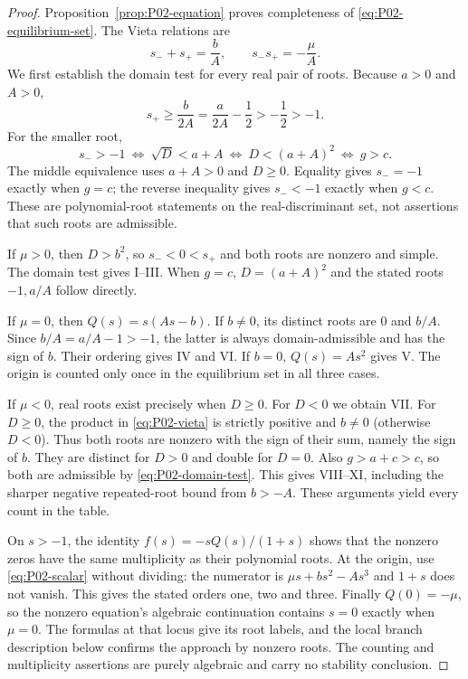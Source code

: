 \documentclass[11pt]{article}
\theoremstyle{definition}
\theoremstyle{remark}
\begin{document}
\begin{proof}
Proposition~\ref{prop:P02-equation} proves completeness of
\eqref{eq:P02-equilibrium-set}. The Vieta relations are
\begin{equation}
\label{eq:P02-vieta}
 s_-+s_+=\frac bA,\qquad s_-s_+=-\frac\mu A.
\end{equation}
We first establish the domain test for every real pair of roots.
Because $a>0$ and $A>0$,
\[
 s_+\ge\frac b{2A}=\frac a{2A}-\frac12>-\frac12>-1.
\]
For the smaller root,
\begin{equation}
\label{eq:P02-domain-test}
 s_->-1
 \ \Longleftrightarrow\ \sqrt D<a+A
 \ \Longleftrightarrow\ D<(a+A)^2
 \ \Longleftrightarrow\ g>c.
\end{equation}
The middle equivalence uses $a+A>0$ and $D\ge0$. Equality gives
$s_-=-1$ exactly when $g=c$; the reverse inequality gives $s_-<-1$
exactly when $g<c$. These are polynomial-root statements on the
real-discriminant set, not assertions that such roots are admissible.

If $\mu>0$, then $D>b^2$, so $s_-<0<s_+$ and both roots are
nonzero and simple. The domain test gives I--III. When $g=c$,
$D=(a+A)^2$ and the stated roots $-1,a/A$ follow directly.

If $\mu=0$, then $Q(s)=s(As-b)$. If $b\ne0$, its distinct roots
are $0$ and $b/A$. Since $b/A=a/A-1>-1$, the latter is always
domain-admissible and has the sign of $b$. Their ordering gives
IV and VI. If $b=0$, $Q(s)=As^2$ gives V. The origin is counted
only once in the equilibrium set in all three cases.

If $\mu<0$, real roots exist precisely when $D\ge0$. For $D<0$
we obtain VII. For $D\ge0$, the product in \eqref{eq:P02-vieta}
is strictly positive and $b\ne0$ (otherwise $D<0$). Thus both
roots are nonzero with the sign of their sum, namely the sign of $b$.
They are distinct for $D>0$ and double for $D=0$. Also
$g>a+c>c$, so both are admissible by \eqref{eq:P02-domain-test}.
This gives VIII--XI, including the sharper negative repeated-root
bound from $b>-A$. These arguments yield every count in the table.

On $s>-1$, the identity $f(s)=-sQ(s)/(1+s)$ shows that the
nonzero zeros have the same multiplicity as their polynomial roots.
At the origin, use \eqref{eq:P02-scalar} without dividing:
the numerator is $\mu s+bs^2-As^3$ and $1+s$ does not vanish.
This gives the stated orders one, two and three. Finally $Q(0)=-\mu$,
so the nonzero equation's algebraic continuation contains $s=0$
exactly when $\mu=0$. The formulas at that locus give its root
labels, and the local branch description below confirms the approach
by nonzero roots. The counting and multiplicity assertions are purely
algebraic and carry no stability conclusion.
\end{proof}
\end{document}
